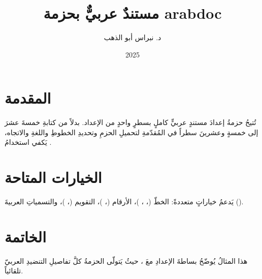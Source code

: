 \documentclass[12pt, a4paper, amiri, captions]{arabdoc-article}
\begin{document}
\title{مستندٌ عربيٌّ بحزمة arabdoc}
\author{د. نبراس أبو الذهب}
\date{2025}
\maketitle

\section{المقدمة}

تُتيحُ حزمةُ  إعدادَ مستندٍ عربيٍّ كاملٍ بسطرٍ واحدٍ
من الإعداد. بدلاً من كتابةِ خمسةَ عشرَ إلى خمسةٍ وعشرينَ سطراً
في المُقدّمةِ لتحميلِ الحزمِ وتحديدِ الخطوطِ واللغةِ والاتجاه،
يَكفي استخدامُ .

\section{الخيارات المتاحة}

يَدعمُ  خياراتٍ متعددةً:
الخطّ (، ، )،
الأرقام (، )،
التقويم (، )،
والتسمياتِ العربيةَ ().

\section{الخاتمة}

هذا المثالُ يُوضّحُ بساطةَ الإعدادِ معَ ، حيثُ
يَتولّى الحزمةُ كلَّ تفاصيلِ التنضيدِ العربيّ تلقائياً.
\end{document}
